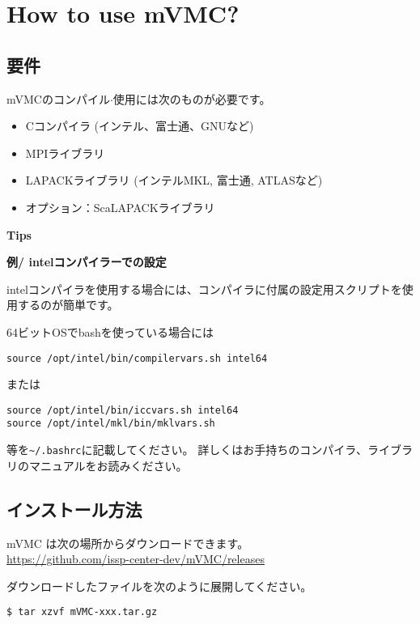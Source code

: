 \chapter{How to use mVMC?}
\label{Ch:HowTo}

\section{要件}

mVMCのコンパイル$\cdot$使用には次のものが必要です。
\begin{itemize}
\item Cコンパイラ (インテル、富士通、GNUなど)
\item MPIライブラリ
\item LAPACKライブラリ (インテルMKL, 富士通, ATLASなど)
\item オプション：ScaLAPACKライブラリ
\end{itemize}

\begin{screen}
\Large 
{\bf Tips}
\normalsize

{\bf 例/ intelコンパイラーでの設定}

intelコンパイラを使用する場合には、コンパイラに付属の設定用スクリプトを使用するのが簡単です。

64ビットOSでbashを使っている場合には
\begin{verbatim}
source /opt/intel/bin/compilervars.sh intel64
\end{verbatim}
または
\begin{verbatim}
source /opt/intel/bin/iccvars.sh intel64
source /opt/intel/mkl/bin/mklvars.sh
\end{verbatim}
等を\verb|~/.bashrc|に記載してください。
詳しくはお手持ちのコンパイラ、ライブラリのマニュアルをお読みください。

\end{screen}

\section{インストール方法}

mVMC は次の場所からダウンロードできます。\\
\url{https://github.com/issp-center-dev/mVMC/releases}


ダウンロードしたファイルを次のように展開してください。
\begin{verbatim}
$ tar xzvf mVMC-xxx.tar.gz
\end{verbatim}

